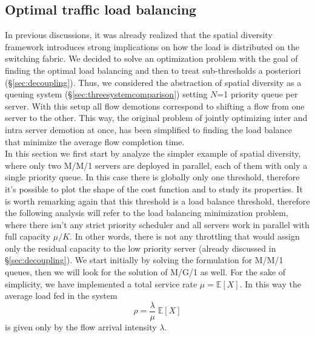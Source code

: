 \subsection{Optimal traffic load balancing}
In previous discussions, it was already realized that the spatial diversity framework introduces strong implications on how the load is distributed on the switching fabric. We decided to solve an optimization problem with the goal of finding the optimal load balancing and then to treat sub-thresholds a posteriori (\S \ref{sec:decoupling}). Thus, we considered the abstraction of spatial diversity as a queuing system (\S \ref{sec:threesystemcomparison}) setting $N$=1 priority queue per server. With this setup all flow demotions correspond to shifting a flow from one server to the other. This way, the original problem of jointly optimizing inter and intra server demotion at once, has been simplified to finding the load balance that minimize the average flow completion time. \\
In this section we first start by analyze the simpler example of spatial diversity, where only two M/M/1 servers are deployed in parallel, each of them with only a single priority queue. In this case there is globally only one threshold, therefore it's possible to plot the shape of the cost function and to study its properties. It is worth remarking again that this threshold is a load balance threshold, therefore the following analysis will refer to the load balancing minimization problem, where there isn't any strict priority scheduler and all servers work in parallel with full capacity $\mu/K$. In other words, there is not any throttling that would assign only the residual capacity to the low priority server (already discussed in \S \ref{sec:decoupling}).  We start initially by solving the formulation for M/M/1 queues, then we will look for the solution of M/G/1 as well. For the sake of simplicity, we have implemented a total service rate $\mu = \mathbb{E}[X]$. In this way the average load fed in the system 
\[
\rho = \frac{\lambda}{\mu}\;\mathbb{E}[X]
\]
is given only by the flow arrival intensity $\lambda$.


